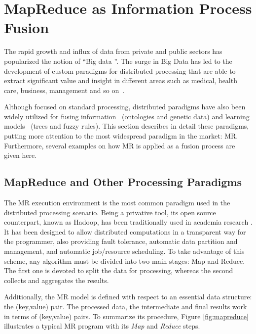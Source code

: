 \documentclass[3p,review]{elsarticle}
\begin{document}
\section{MapReduce as Information Process Fusion}\label{sec:mr}

The rapid growth and influx of data from private and public sectors has popularized the notion of ``Big data \cite{Fer14}''. The surge in Big Data has led to the development of custom paradigms for distributed processing that are able to extract significant value and insight in different areas such as medical, health care, business, management and so on~\cite{Kam14,Chen14,wu14}. 

Although focused on standard processing, distributed paradigms have also been widely utilized for fusing information~\cite{zhang14b, meng15} (ontologies and genetic data) and learning models~\cite{rio14b, rio15b} (trees and fuzzy rules). This section describes in detail these paradigms, putting more attention to the most widespread paradigm in the market: MR. Furthermore, several examples on how MR is applied as a fusion process are given here.

\subsection{MapReduce and Other Processing Paradigms}\label{subsec:mr}


The MR execution environment \cite{Dea08} is the most common paradigm used in the distributed processing scenario. Being a privative tool, its open source counterpart, known as Hadoop, has been traditionally used in academia research \cite{Whi15-Hadoop}. It has been designed to allow distributed computations in a transparent way for the programmer, also providing fault tolerance, automatic data partition and management, and automatic job/resource scheduling. To take advantage of this scheme, any algorithm must be divided into two main stages: Map and Reduce. The first one is devoted to split the data for processing, whereas the second collects and aggregates the results.

Additionally, the MR model is defined with respect to an essential data structure: the (key,value) pair. The processed data, the intermediate and final results work in terms of (key,value) pairs. To summarize its procedure, Figure \ref{fig:mapreduce} illustrates a typical MR program with its \textit{Map} and \textit{Reduce} steps. %
\end{document}
